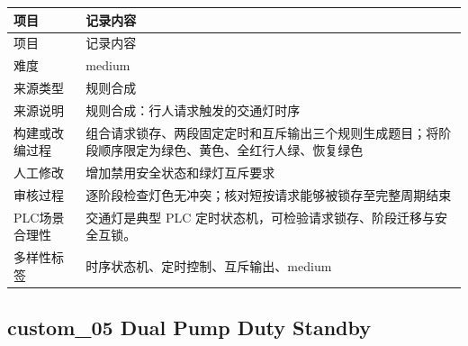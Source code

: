 \begin{longtable}{L{3.0cm}L{10.3cm}}

\toprule

项目 & 记录内容\\

\midrule

\endfirsthead

\toprule

项目 & 记录内容\\

\midrule

\endhead

难度 & medium\\

来源类型 & 规则合成\\

来源说明 & 规则合成：行人请求触发的交通灯时序\\

构建或改编过程 & 组合请求锁存、两段固定定时和互斥输出三个规则生成题目；将阶段顺序限定为绿色、黄色、全红行人绿、恢复绿色\\

人工修改 & 增加禁用安全状态和绿灯互斥要求\\

审核过程 & 逐阶段检查灯色无冲突；核对短按请求能够被锁存至完整周期结束\\

PLC场景合理性 & 交通灯是典型 PLC 定时状态机，可检验请求锁存、阶段迁移与安全互锁。\\

多样性标签 & 时序状态机、定时控制、互斥输出、medium\\

\bottomrule

\end{longtable}

\subsection{{\ttfamily custom\_05} Dual Pump Duty Standby}

